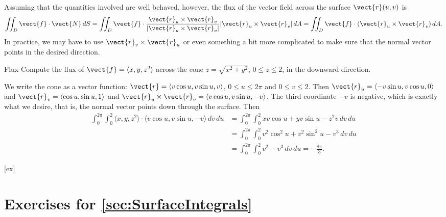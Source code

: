 Assuming that the quantities involved are well behaved, however, the
flux of the vector field across the surface $\vect{r}(u,v)$ is
$$\iint_{D} \vect{f}\cdot\vect{N}\,dS
=\iint_{D}\vect{f}\cdot 
 {\vect{r}_u\times\vect{r}_v\over|\vect{r}_u\times\vect{r}_v|}
 |\vect{r}_u\times\vect{r}_v|\,dA
=\iint_{D}\vect{f}\cdot (\vect{r}_u\times\vect{r}_v)\,dA.$$
In practice, we may have to use $\vect{r}_v\times\vect{r}_u$
or even something a bit more complicated to make sure that the normal
vector points in the desired direction.

\begin{example}{Flux}{}
Compute the flux of $\vect{f}=\langle x,y,z^2\rangle$ across the
cone $z=\sqrt{x^2+y^2}$, $0\le z\le 2$, in the downward direction.
\end{example}
\begin{solution}
We write the cone as a vector function: $\vect{r}=\langle v\cos u, v\sin u,
v\rangle$, $0\le u\le 2\pi$ and $0\le v\le 2$.
Then $\vect{r}_u=\langle -v\sin u, v\cos u,0\rangle$ and 
$\vect{r}_v=\langle \cos u, \sin u, 1\rangle$ and
$\vect{r}_u\times\vect{r}_v=\langle v\cos u,v\sin u,-v\rangle$.
The third coordinate $-v$ is negative, which is exactly what we
desire, that is, the normal vector points down through the
surface. Then 
\begin{align*}
\int_0^{2\pi}\int_0^2 \langle x,y,z^2\rangle\cdot\langle v\cos u,v\sin u,-v\rangle \,dv\,du
&=\int_0^{2\pi}\int_0^2 xv\cos u+yv\sin u-z^2v\,dv\,du	\\
&=\int_0^{2\pi}\int_0^2 v^2\cos^2 u+ v^2\sin^2 u-v^3\,dv\,du	\\
&=\int_0^{2\pi}\int_0^2 v^2-v^3\,dv\,du=-\frac{8\pi}{3}.
\end{align*}
\end{solution}


[ex]
\section*{Exercises for \ref{sec:SurfaceIntegrals}}

